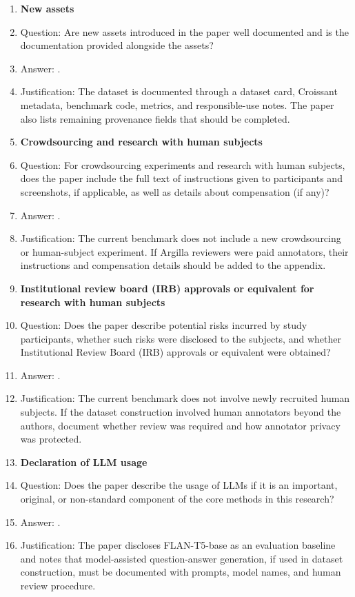 \begin{enumerate}
\item {\bf New assets}
    \item[] Question: Are new assets introduced in the paper well documented and is the documentation provided alongside the assets?
    \item[] Answer: \answerYes{}.
    \item[] Justification: The dataset is documented through a dataset card, Croissant metadata, benchmark code, metrics, and responsible-use notes. The paper also lists remaining provenance fields that should be completed.

\item {\bf Crowdsourcing and research with human subjects}
    \item[] Question: For crowdsourcing experiments and research with human subjects, does the paper include the full text of instructions given to participants and screenshots, if applicable, as well as details about compensation (if any)?
    \item[] Answer: \answerNA{}.
    \item[] Justification: The current benchmark does not include a new crowdsourcing or human-subject experiment. If Argilla reviewers were paid annotators, their instructions and compensation details should be added to the appendix.

\item {\bf Institutional review board (IRB) approvals or equivalent for research with human subjects}
    \item[] Question: Does the paper describe potential risks incurred by study participants, whether such risks were disclosed to the subjects, and whether Institutional Review Board (IRB) approvals or equivalent were obtained?
    \item[] Answer: \answerNA{}.
    \item[] Justification: The current benchmark does not involve newly recruited human subjects. If the dataset construction involved human annotators beyond the authors, document whether review was required and how annotator privacy was protected.

\item {\bf Declaration of LLM usage}
    \item[] Question: Does the paper describe the usage of LLMs if it is an important, original, or non-standard component of the core methods in this research?
    \item[] Answer: \answerYes{}.
    \item[] Justification: The paper discloses FLAN-T5-base as an evaluation baseline and notes that model-assisted question-answer generation, if used in dataset construction, must be documented with prompts, model names, and human review procedure.

\end{enumerate}
